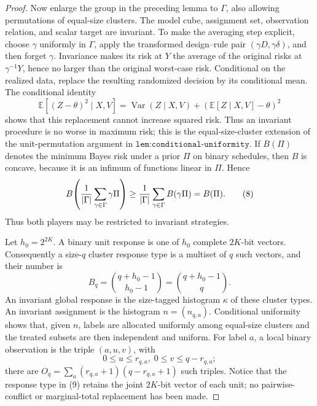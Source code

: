 \documentclass{article}
\begin{document}
\begin{proof}
Now enlarge the group in the preceding lemma to \(\Gamma\), also allowing
permutations of equal-size clusters.  The model cube, assignment set,
observation relation, and scalar target are invariant.  To make the averaging
step explicit, choose \(\gamma\) uniformly in \(\Gamma\), apply the transformed
design--rule pair \((\gamma D,\gamma\delta)\), and then forget \(\gamma\).
Invariance makes its risk at \(Y\) the average of the original risks at
\(\gamma^{-1}Y\), hence no larger than the original worst-case risk.  Conditional
on the realized data, replace the resulting randomized decision by its
conditional mean.  The conditional identity
\[
 \mathbb E[(Z-\theta)^2\mid X,V]
 =\operatorname{Var}(Z\mid X,V)
  +(\mathbb E[Z\mid X,V]-\theta)^2
\]
shows that this replacement cannot increase squared risk.  Thus an invariant
procedure is no worse in maximum risk; this is the equal-size-cluster extension
of the unit-permutation argument in
\(\texttt{lem:conditional-uniformity}\).  If \(B(\Pi)\) denotes the minimum
Bayes risk under a prior \(\Pi\) on binary schedules, then \(B\) is concave,
because it is an infimum of functions linear in \(\Pi\).  Hence
\[
 B\!\left({1\over|\Gamma|}\sum_{\gamma\in\Gamma}\gamma\Pi\right)
 \ge {1\over|\Gamma|}\sum_{\gamma\in\Gamma}B(\gamma\Pi)=B(\Pi).       \tag{8}
\]
Thus both players may be restricted to invariant strategies.

Let \(h_0=2^{2K}\).  A binary unit response is one of \(h_0\) complete \(2K\)-bit vectors.  Consequently a size-\(q\) cluster response type is a multiset of \(q\) such vectors, and their number is
\[
 B_q=\binom{q+h_0-1}{h_0-1}=\binom{q+h_0-1}{q}.                             \tag{9}
\]
An invariant global response is the size-tagged histogram \(\kappa\) of these cluster types.  An invariant assignment is the histogram \(n=(n_{q,a})\).  Conditional uniformity shows that, given \(n\), labels are allocated uniformly among equal-size clusters and the treated subsets are then independent and uniform.  For label \(a\), a local binary observation is the triple \((a,u,v)\), with
\[
 0\le u\le r_{q,a},\; 0\le v\le q-r_{q,a};                               \tag{10}
\]
there are \(O_q=\sum_a(r_{q,a}+1)(q-r_{q,a}+1)\) such triples.  Notice that the response type in (9) retains the joint \(2K\)-bit vector of each unit; no pairwise-conflict or marginal-total replacement has been made.


\end{proof}
\end{document}
